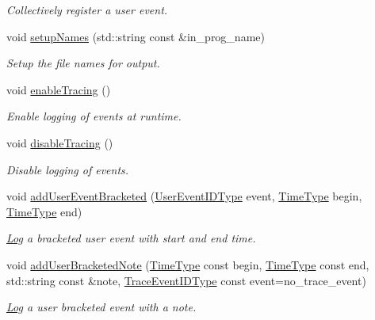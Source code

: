 \begin{DoxyCompactItemize}
\begin{DoxyCompactList}\small\item\em Collectively register a user event. \end{DoxyCompactList}\item 
void \hyperlink{structvt_1_1trace_1_1_trace_lite_a1f8e52289799bcd6b469b20be7d1e149}{setup\+Names} (std\+::string const \&in\+\_\+prog\+\_\+name)
\begin{DoxyCompactList}\small\item\em Setup the file names for output. \end{DoxyCompactList}\item 
void \hyperlink{structvt_1_1trace_1_1_trace_lite_a99c538b6e3cd2521bba5cba161ac4240}{enable\+Tracing} ()
\begin{DoxyCompactList}\small\item\em Enable logging of events at runtime. \end{DoxyCompactList}\item 
void \hyperlink{structvt_1_1trace_1_1_trace_lite_ac494fd6858647fd548b6554cf066568b}{disable\+Tracing} ()
\begin{DoxyCompactList}\small\item\em Disable logging of events. \end{DoxyCompactList}\item 
void \hyperlink{structvt_1_1trace_1_1_trace_lite_a89debafdd045528b81f85d3d7315a5f0}{add\+User\+Event\+Bracketed} (\hyperlink{namespacevt_1_1trace_a5908920d051c144c89f17c69ed262350}{User\+Event\+I\+D\+Type} event, \hyperlink{namespacevt_a2b9f28078dc309ad0706b69ded743e69}{Time\+Type} begin, \hyperlink{namespacevt_a2b9f28078dc309ad0706b69ded743e69}{Time\+Type} end)
\begin{DoxyCompactList}\small\item\em \hyperlink{structvt_1_1trace_1_1_log}{Log} a bracketed user event with start and end time. \end{DoxyCompactList}\item 
void \hyperlink{structvt_1_1trace_1_1_trace_lite_aa45597cc7a0dfee2ed21cda1c009613a}{add\+User\+Bracketed\+Note} (\hyperlink{namespacevt_a2b9f28078dc309ad0706b69ded743e69}{Time\+Type} const begin, \hyperlink{namespacevt_a2b9f28078dc309ad0706b69ded743e69}{Time\+Type} const end, std\+::string const \&note, \hyperlink{namespacevt_1_1trace_a64a7185f3e102df8d8258f263ccd1582}{Trace\+Event\+I\+D\+Type} const event=no\+\_\+trace\+\_\+event)
\begin{DoxyCompactList}\small\item\em \hyperlink{structvt_1_1trace_1_1_log}{Log} a user bracketed event with a note. \end{DoxyCompactList}\item 

\end{DoxyCompactItemize}
